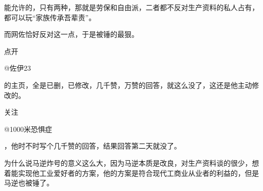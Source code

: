 \begin{zhihuanswer}
能允许的，只有两种，那就是劳保和自由派，二者都不反对生产资料的私人占有，都可以玩``家族传承吾辈责''。

而网佐恰好反对这一点，于是被锤的最狠。

点开

@佐伊23

的主页，全是已删，已修改，几千赞，万赞的回答，就这么没了，这还是他主动修改的。

关注

@1000米恐惧症

，他时不时写个几千赞的回答，结果回答第二天就没了。

为什么说马逆炸号的意义这么大，因为马逆本质是改良，对生产资料谈的很少，想着能实现他工业爱好者的方案，他的方案是符合现代工商业从业者的利益的，但是马逆也被锤了。
\end{zhihuanswer}
